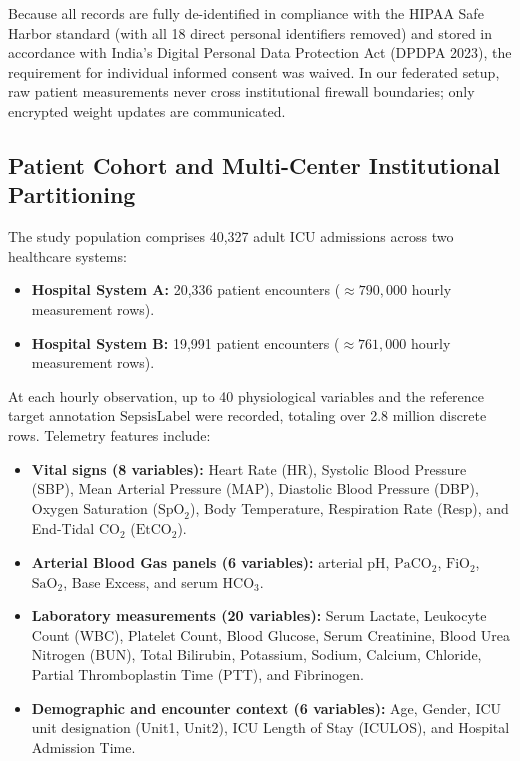 \documentclass[11pt,a4paper]{article}
\begin{document}
Because all records are fully de-identified in compliance with the HIPAA Safe Harbor standard (with all 18 direct personal identifiers removed) and stored in accordance with India's Digital Personal Data Protection Act (DPDPA 2023), the requirement for individual informed consent was waived. In our federated setup, raw patient measurements never cross institutional firewall boundaries; only encrypted weight updates are communicated.

\subsection{Patient Cohort and Multi-Center Institutional Partitioning}
The study population comprises 40,327 adult ICU admissions across two healthcare systems:
\begin{itemize}[leftmargin=*]
    \item \textbf{Hospital System A:} 20,336 patient encounters ($\approx 790,000$ hourly measurement rows).
    \item \textbf{Hospital System B:} 19,991 patient encounters ($\approx 761,000$ hourly measurement rows).
\end{itemize}

At each hourly observation, up to 40 physiological variables and the reference target annotation $\text{SepsisLabel}$ were recorded, totaling over 2.8 million discrete rows. Telemetry features include:
\begin{itemize}[leftmargin=*]
    \item \textbf{Vital signs (8 variables):} Heart Rate (HR), Systolic Blood Pressure (SBP), Mean Arterial Pressure (MAP), Diastolic Blood Pressure (DBP), Oxygen Saturation ($\text{SpO}_2$), Body Temperature, Respiration Rate (Resp), and End-Tidal $\text{CO}_2$ ($\text{EtCO}_2$).
    \item \textbf{Arterial Blood Gas panels (6 variables):} arterial pH, $\text{PaCO}_2$, $\text{FiO}_2$, $\text{SaO}_2$, Base Excess, and serum $\text{HCO}_3$.
    \item \textbf{Laboratory measurements (20 variables):} Serum Lactate, Leukocyte Count (WBC), Platelet Count, Blood Glucose, Serum Creatinine, Blood Urea Nitrogen (BUN), Total Bilirubin, Potassium, Sodium, Calcium, Chloride, Partial Thromboplastin Time (PTT), and Fibrinogen.
    \item \textbf{Demographic and encounter context (6 variables):} Age, Gender, ICU unit designation (Unit1, Unit2), ICU Length of Stay (ICULOS), and Hospital Admission Time.
\end{itemize}
\end{document}
